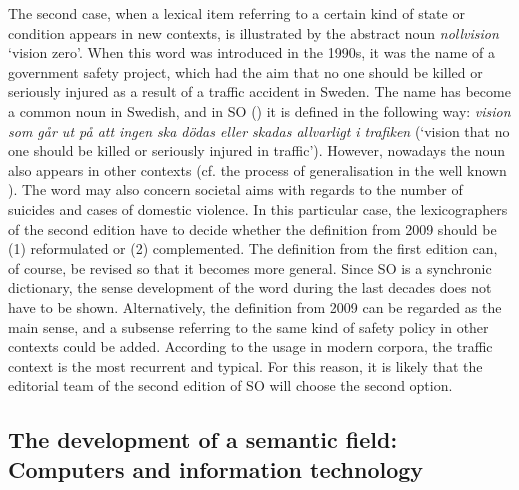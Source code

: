 \documentclass[output=paper]{langscibook}
\begin{document}
The second case, when a lexical item referring to a certain kind of state or condition appears in new contexts, is illustrated by the abstract noun \emph{nollvision} `vision zero'. When this word was introduced in the 1990s, it was the name of a government safety project, which had the aim that no one should be killed or seriously injured as a result of a traffic accident in Sweden. The name has become a common noun in Swedish, and in SO (\citeyear{SO2009}) it is defined in the following way: \textit{vision som går ut på att ingen ska dödas eller skadas allvarligt i trafiken} (`vision that no one should be killed or seriously injured in traffic'). However, nowadays the noun also appears in other contexts (cf. the process of generalisation in the well known \citealt{waldron1967}). The word may also concern societal aims with regards to the number of suicides and cases of domestic violence. In this particular case, the lexicographers of the second edition have to decide whether the definition from 2009 should be (1) reformulated or (2) complemented. The definition from the first edition can, of course, be revised so that it becomes more general. Since SO is a synchronic dictionary, the sense development of the word during the last decades does not have to be shown. Alternatively, the definition from 2009 can be regarded as the main sense, and a subsense referring to the same kind of safety policy in other contexts could be added. According to the usage in modern corpora, the traffic context is the most recurrent and typical. For this reason, it is likely that the editorial team of the second edition of SO will choose the second option.

\subsection{The development of a semantic field: Computers and information technology}\label{subsec:devsemfield}
\end{document}
